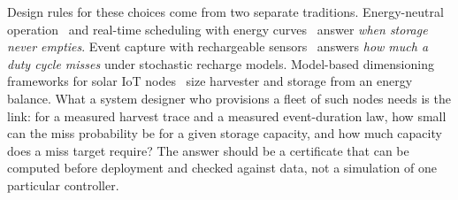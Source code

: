 \documentclass[final,5p,times,twocolumn]{elsarticle}
\theoremstyle{definition}
\theoremstyle{remark}
\begin{document}
Design rules for these choices come from two separate traditions. Energy-neutral operation~\cite{kansal2007,buchli2014sensys} and real-time scheduling with energy curves~\cite{moser2007rts} answer \emph{when storage never empties}. Event capture with rechargeable sensors~\cite{kar2006ton,jaggi2009wn,ren2014tpds,yau2010tosn} answers \emph{how much a duty cycle misses} under stochastic recharge models. Model-based dimensioning frameworks for solar IoT nodes~\cite{kuaban2025iwcmc} size harvester and storage from an energy balance. What a system designer who provisions a fleet of such nodes needs is the link: for a measured harvest trace and a measured event-duration law, how small can the miss probability be for a given storage capacity, and how much capacity does a miss target require? The answer should be a certificate that can be computed before deployment and checked against data, not a simulation of one particular controller.
\end{document}
